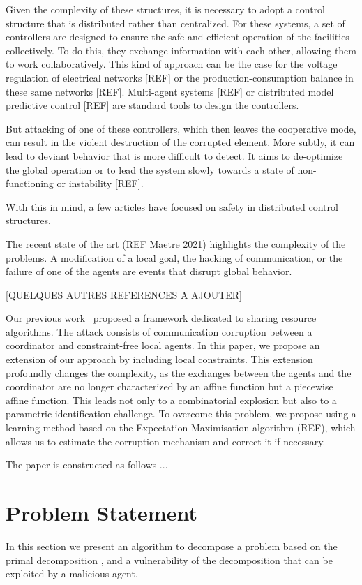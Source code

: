 \documentclass{ifacconf}  %
\begin{document}
Given the complexity of these structures, it is necessary to adopt a control
structure that is distributed rather than centralized. For these systems, a
set of controllers are designed to ensure the safe and efficient operation
of the facilities collectively. To do this, they exchange information with
each other, allowing them to work collaboratively. This kind of approach can
be the case for the voltage regulation of electrical networks [REF] or the
production-consumption balance in these same networks [REF]. Multi-agent
systems [REF] or distributed model predictive control [REF] are standard
tools to design the controllers.

But attacking of one of these controllers, which then leaves the cooperative
mode, can result in the violent destruction of the corrupted element. More
subtly, it can lead to deviant behavior that is more difficult to detect. It
aims to de-optimize the global operation or to lead the system slowly
towards a state of non-functioning or instability [REF].

With this in mind, a few articles have focused on safety in distributed
control structures.

The recent state of the art (REF Maetre 2021) highlights the complexity of
the problems. A modification of a local goal, the hacking of communication,
or the failure of one of the agents are events that disrupt global behavior.

[QUELQUES AUTRES REFERENCES A AJOUTER]

Our previous work~\citep{NogueiraEtAl2021} proposed a framework dedicated to
sharing resource algorithms. The attack consists of communication corruption
between a coordinator and constraint-free local agents. In this paper, we
propose an extension of our approach by including local constraints. This
extension profoundly changes the complexity, as the exchanges between the
agents and the coordinator are no longer characterized by an affine function
but a piecewise affine function. This leads not only to a combinatorial
explosion but also to a parametric identification challenge. To overcome
this problem, we propose using a learning method based on the Expectation
Maximisation algorithm (REF), which allows us to estimate the corruption
mechanism and correct it if necessary.


The paper is constructed as follows ...


\section{Problem Statement}\label{sec:PS}
In this section we present an algorithm to decompose a \mpc{} problem based on the primal decomposition \citep{BoydEtAl2015}, and a vulnerability of the decomposition that can be exploited by a malicious agent.
\end{document}
